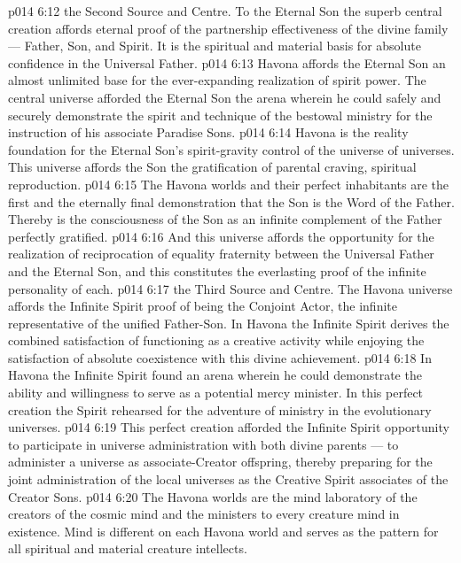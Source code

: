 \vs p014 6:12 \bibnobreakspace {} the Second Source and Centre. To the Eternal Son the superb central creation affords eternal proof of the partnership effectiveness of the divine family --- Father, Son, and Spirit. It is the spiritual and material basis for absolute confidence in the Universal Father.
\vs p014 6:13 Havona affords the Eternal Son an almost unlimited base for the ever\hyp{}expanding realization of spirit power. The central universe afforded the Eternal Son the arena wherein he could safely and securely demonstrate the spirit and technique of the bestowal ministry for the instruction of his associate Paradise Sons.
\vs p014 6:14 Havona is the reality foundation for the Eternal Son’s spirit\hyp{}gravity control of the universe of universes. This universe affords the Son the gratification of parental craving, spiritual reproduction.
\vs p014 6:15 The Havona worlds and their perfect inhabitants are the first and the eternally final demonstration that the Son is the Word of the Father. Thereby is the consciousness of the Son as an infinite complement of the Father perfectly gratified.
\vs p014 6:16 And this universe affords the opportunity for the realization of reciprocation of equality fraternity between the Universal Father and the Eternal Son, and this constitutes the everlasting proof of the infinite personality of each.
\vs p014 6:17 \bibnobreakspace {} the Third Source and Centre. The Havona universe affords the Infinite Spirit proof of being the Conjoint Actor, the infinite representative of the unified Father\hyp{}Son. In Havona the Infinite Spirit derives the combined satisfaction of functioning as a creative activity while enjoying the satisfaction of absolute coexistence with this divine achievement.
\vs p014 6:18 In Havona the Infinite Spirit found an arena wherein he could demonstrate the ability and willingness to serve as a potential mercy minister. In this perfect creation the Spirit rehearsed for the adventure of ministry in the evolutionary universes.
\vs p014 6:19 This perfect creation afforded the Infinite Spirit opportunity to participate in universe administration with both divine parents --- to administer a universe as associate\hyp{}Creator offspring, thereby preparing for the joint administration of the local universes as the Creative Spirit associates of the Creator Sons.
\vs p014 6:20 The Havona worlds are the mind laboratory of the creators of the cosmic mind and the ministers to every creature mind in existence. Mind is different on each Havona world and serves as the pattern for all spiritual and material creature intellects.
